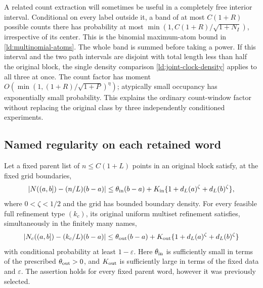 A related count extraction will sometimes be useful in a completely
free interior interval.  Conditional on every label outside it, a
band of at most \(C(1+R)\) possible counts there has probability at
most \(\min(1,C(1+R)/\sqrt{1+N_I})\), irrespective of its center.
This is the binomial maximum-atom bound in
\eqref{ld:multinomial-atoms}.  The whole band is summed before taking
a power.  If this interval and the two path intervals are disjoint
with total length less than half the original block, the single
density comparison \eqref{ld:joint-clock-density} applies to all
three at once.  The count factor has moment
\(O(\min(1,(1+R)/\sqrt{1+P})^\eta)\); atypically small occupancy
has exponentially small probability.  This explains the ordinary
count-window factor without replacing the original class by three
independently conditioned experiments.

\subsection{Named regularity on each retained word}

\begin{lemma}
\label{ld:named-REG}
Let a fixed parent list of \(n\le C(1+L)\) points in an original
block satisfy, at the fixed grid boundaries,
\begin{equation}
 |N((a,b])-(n/L)(b-a)|\le
 \theta_{\rm in}(b-a)+K_{\rm in}
       \{1+d_L(a)^\zeta+d_L(b)^\zeta\},
 \label{ld:parent-REG}
\end{equation}
where \(0<\zeta<1/2\) and the grid has bounded boundary density.
For every feasible full refinement type \((k_c)\), its original
uniform multiset refinement satisfies, simultaneously in the finitely
many names,
\begin{equation}
 |N_c((a,b])-(k_c/L)(b-a)|\le
 \theta_{\rm out}(b-a)+K_{\rm out}
       \{1+d_L(a)^\zeta+d_L(b)^\zeta\}
 \label{ld:child-REG}
\end{equation}
with conditional probability at least \(1-\varepsilon\).
Here \(\theta_{\rm in}\) is sufficiently small in terms of the
prescribed \(\theta_{\rm out}>0\), and \(K_{\rm out}\) is sufficiently
large in terms of the fixed data and \(\varepsilon\).  The assertion
holds for every fixed parent word, however it was previously selected.
\end{lemma}

